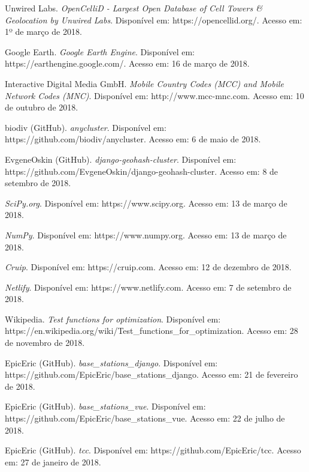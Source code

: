 \documentclass[]{politex}
\begin{document}
\begin{thebibliography}{9}
    Unwired Labs.
    \textit{OpenCelliD - Largest Open Database of Cell Towers \&
    Geolocation by Unwired Labs}.
    Disponível em: https://opencellid.org/.
    Acesso em: 1º de março de 2018.

    Google Earth.
    \textit{Google Earth Engine}.
    Disponível em: https://earthengine.google.com/.
    Acesso em: 16 de março de 2018.

    Interactive Digital Media GmbH.
    \textit{Mobile Country Codes (MCC) and Mobile Network Codes (MNC)}.
    Disponível em: http://www.mcc-mnc.com.
    Acesso em: 10 de outubro de 2018.

    biodiv (GitHub).
    \textit{anycluster}.
    Disponível em: https://github.com/biodiv/anycluster.
    Acesso em: 6 de maio de 2018.

    EvgeneOskin (GitHub).
    \textit{django-geohash-cluster}.
    Disponível em: https://github.com/EvgeneOskin/django-geohash-cluster.
    Acesso em: 8 de setembro de 2018.

    \textit{SciPy.org}.
    Disponível em: https://www.scipy.org.
    Acesso em: 13 de março de 2018.

    \textit{NumPy}.
    Disponível em: https://www.numpy.org.
    Acesso em: 13 de março de 2018.

    \textit{Cruip}.
    Disponível em: https://cruip.com.
    Acesso em: 12 de dezembro de 2018.

    \textit{Netlify}.
    Disponível em: https://www.netlify.com.
    Acesso em: 7 de setembro de 2018.

    Wikipedia.
    \textit{Test functions for optimization}.
    Disponível em:
    https://en.wikipedia.org/wiki/Test\_functions\_for\_optimization.
    Acesso em: 28 de novembro de 2018.

    EpicEric (GitHub).
    \textit{base\_stations\_django}.
    Disponível em: https://github.com/EpicEric/base\_stations\_django.
    Acesso em: 21 de fevereiro de 2018.

    EpicEric (GitHub).
    \textit{base\_stations\_vue}.
    Disponível em: https://github.com/EpicEric/base\_stations\_vue.
    Acesso em: 22 de julho de 2018.

    EpicEric (GitHub).
    \textit{tcc}.
    Disponível em: https://github.com/EpicEric/tcc.
    Acesso em: 27 de janeiro de 2018.


\end{thebibliography}
\end{document}
